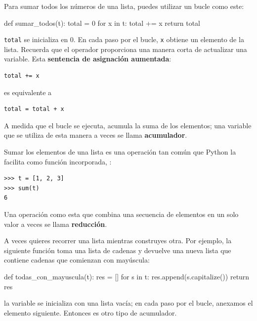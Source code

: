 Para sumar todos los números de una lista, puedes utilizar un bucle como este:

\begin{python}[frame=single]
def sumar_todos(t):
    total = 0
    for x in t:
        total += x
    return total
\end{python}


\texttt{total} se inicializa en 0.  En cada paso por el bucle,
\texttt{x} obtiene un elemento de la lista.  Recuerda que el operador 
\pythoninline{+=} proporciona una manera corta de actualizar una variable.  Esta
\textbf{ sentencia de asignación aumentada}:

\begin{Verbatim}[frame=single]
total += x
\end{Verbatim}
%
es equivalente a

\begin{Verbatim}[frame=single]
total = total + x
\end{Verbatim}
%
A medida que el bucle se ejecuta,  acumula la suma de los
elementos; una variable que se utiliza de esta manera a veces se llama
\textbf{ acumulador}.

Sumar los elementos de una lista es una operación tan común
que Python la facilita como función incorporada, :

\begin{Verbatim}[frame=single]
>>> t = [1, 2, 3]
>>> sum(t)
6
\end{Verbatim}
%
Una operación como esta que combina una secuencia de elementos en
un solo valor a veces se llama \textbf{ reducción}.

A veces quieres recorrer una lista mientras construyes
otra.  Por ejemplo, la siguiente función toma una lista de cadenas
y devuelve una nueva lista que contiene cadenas que comienzan con mayúscula:

\begin{python}[frame=single]
def todas_con_mayuscula(t):
    res = []
    for s in t:
        res.append(s.capitalize())
    return res
\end{python}
%
la variable  se inicializa con una lista vacía; en cada paso por el bucle,
anexamos el elemento siguiente.  Entonces  es otro
tipo de acumulador.

